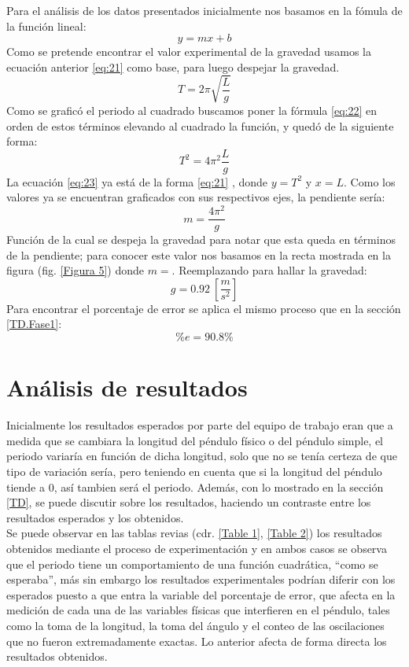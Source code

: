 \documentclass[spanish,notitlepage,letterpaper, 12pt]{article}
\begin{document}
Para el análisis de los datos presentados inicialmente nos basamos en la fómula de la función lineal:
\begin{equation} \label{eq:21}
    y=mx+b
\end{equation}
Como se pretende encontrar el valor experimental de la gravedad usamos la ecuación anterior \eqref{eq:21} como base, para luego despejar la gravedad.
\begin{equation} \label{eq:22}
    T=2\pi\sqrt{\frac{L}{g}}
\end{equation}
Como se graficó el periodo al cuadrado buscamos poner la fórmula \eqref{eq:22} en orden de estos términos elevando al cuadrado la función, y quedó de la siguiente forma:
\begin{equation} \label{eq:23}
    T^2=4\pi^2\frac{L}{g}
\end{equation}
La ecuación \eqref{eq:23} ya está de la forma \eqref{eq:21} , donde $y=T^2$ y $x=L$. Como los valores ya se encuentran graficados con sus respectivos ejes, la pendiente sería:
\begin{equation} 
    m=\frac{4\pi^2}{g}
\end{equation}
Función de la cual se despeja la gravedad para notar que esta queda en términos de la pendiente; para conocer este valor nos basamos en la recta mostrada en la figura (fig. \ref{Figura 5}) donde $m=$. Reemplazando para hallar la gravedad:
\begin{equation}
    g=0.92 \ [\frac{m}{s^2}]
\end{equation}
Para encontrar el porcentaje de error se aplica el mismo proceso que en la sección \ref{TD.Fase1}: $$\%e=90.8\%$$

\section{Análisis de resultados}

Inicialmente los resultados esperados por parte del equipo de trabajo eran que a medida que se cambiara la longitud del péndulo físico o del péndulo simple, el periodo variaría en función de dicha longitud, solo que no se tenía certeza de que tipo de variación sería, pero teniendo en cuenta que si la longitud del péndulo tiende a 0, así tambien será el periodo. Además, con lo mostrado en la sección \ref{TD}, se puede discutir sobre los resultados, haciendo un contraste entre los resultados esperados y los obtenidos.\\

Se puede observar en las tablas revias (cdr. \ref{Table 1}, \ref{Table 2}) los resultados obtenidos mediante el proceso de experimentación y en ambos casos se observa que el periodo tiene un comportamiento de una función cuadrática, “como se esperaba”, más sin embargo los resultados experimentales podrían diferir con los esperados puesto a que entra la variable del porcentaje de error, que afecta en la medición de cada una de las variables físicas que interfieren en el péndulo, tales como la toma de la longitud, la toma del ángulo y el conteo de las oscilaciones que no fueron extremadamente exactas. Lo anterior afecta de forma directa los resultados obtenidos.
\end{document}
